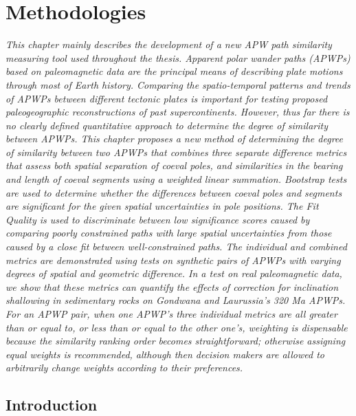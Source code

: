 \chapter{Methodologies}\label{chap:Metho}
\textit{This chapter mainly describes the development of a new APW path
similarity measuring tool used throughout the thesis. Apparent polar wander
paths (APWPs) based on paleomagnetic data are the principal means of describing
plate motions through most of Earth history. Comparing the spatio-temporal
patterns and trends of APWPs between different tectonic plates is important for
testing proposed paleogeographic reconstructions of past supercontinents.
However, thus far there is no clearly defined quantitative approach to determine
the degree of similarity between APWPs. This chapter proposes a new method of
determining the degree of similarity between two APWPs that combines three
separate difference metrics that assess both spatial separation of coeval poles,
and similarities in the bearing and length of coeval segments using a weighted
linear summation. Bootstrap tests are used to determine whether the differences
between coeval poles and segments are significant for the given spatial
uncertainties in pole positions. The Fit Quality is used to discriminate between
low significance scores caused by comparing poorly constrained paths with large
spatial uncertainties from those caused by a close fit between well-constrained
paths. The individual and combined metrics are demonstrated using tests on
synthetic pairs of APWPs with varying degrees of spatial and geometric
difference. In a test on real paleomagnetic data, we show that these metrics can
quantify the effects of correction for inclination shallowing in sedimentary
rocks on Gondwana and Laurussia's 320 Ma APWPs. For an APWP pair,
when one APWP's three individual metrics are all greater than or equal to, or
less than or equal to the other one's, weighting is dispensable because the
similarity ranking order becomes straightforward; otherwise assigning equal
weights is recommended, although then decision makers are allowed to arbitrarily
change weights according to their preferences.}
\vfill
\minitoc\newpage

\section{Introduction}

